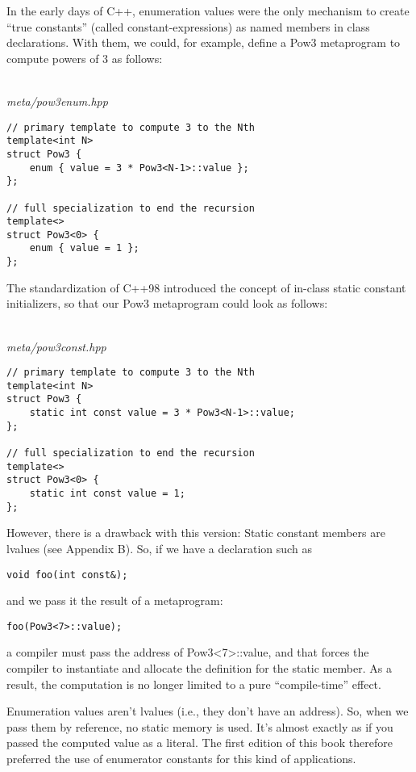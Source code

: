 
In the early days of C++, enumeration values were the only mechanism to create “true constants” (called constant-expressions) as named members in class declarations. With them, we could, for example, define a Pow3 metaprogram to compute powers of 3 as follows:

\hspace*{\fill} \\ %
\noindent
\textit{meta/pow3enum.hpp}
\begin{lstlisting}[style=styleCXX]
// primary template to compute 3 to the Nth
template<int N>
struct Pow3 {
	enum { value = 3 * Pow3<N-1>::value };
};

// full specialization to end the recursion
template<>
struct Pow3<0> {
	enum { value = 1 };
};
\end{lstlisting}

The standardization of C++98 introduced the concept of in-class static constant initializers, so that our Pow3 metaprogram could look as follows:

\hspace*{\fill} \\ %
\noindent
\textit{meta/pow3const.hpp}
\begin{lstlisting}[style=styleCXX]
// primary template to compute 3 to the Nth
template<int N>
struct Pow3 {
	static int const value = 3 * Pow3<N-1>::value;
};

// full specialization to end the recursion
template<>
struct Pow3<0> {
	static int const value = 1;
};
\end{lstlisting}

However, there is a drawback with this version: Static constant members are lvalues (see Appendix B). So, if we have a declaration such as

\begin{lstlisting}[style=styleCXX]
void foo(int const&);
\end{lstlisting}

and we pass it the result of a metaprogram:

\begin{lstlisting}[style=styleCXX]
foo(Pow3<7>::value);
\end{lstlisting}

a compiler must pass the address of Pow3<7>::value, and that forces the compiler to instantiate and allocate the definition for the static member. As a result, the computation is no longer limited to a pure “compile-time” effect.

Enumeration values aren’t lvalues (i.e., they don’t have an address). So, when we pass them by reference, no static memory is used. It’s almost exactly as if you passed the computed value as a literal. The first edition of this book therefore preferred the use of enumerator constants for this kind of applications.

